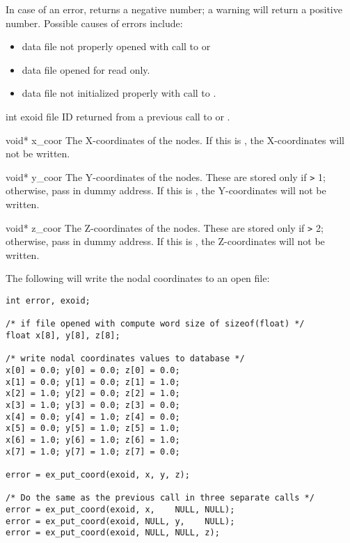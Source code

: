 In case of an error,  returns a negative 
number; a warning will return a positive number. 
Possible causes of errors include:

\begin{itemize}
 \item data file not properly opened with call to 
 or 

 \item data file opened for read only.

 \item data file not initialized properly with call to
 .
\end{itemize}




\begin{parameters}
\item[{int exoid \R{}}]
\exo{} file ID returned from a previous call to  
or .

\item[{void* x_coor \R{}}]
The X-coordinates of the nodes. If this is , the
X-coordinates will not be written.

\item[{void* y_coor \R{}}]
The Y-coordinates of the nodes. These are stored only if  
\texttt{>} 1; otherwise, pass in dummy address. If this is , the
Y-coordinates will not be written.

\item[{void* z_coor \R{}}]
The Z-coordinates of the nodes. These are stored only if  
\texttt{>} 2; otherwise, pass in dummy address. If this is , the
Z-coordinates will not be written.
\end{parameters}

The following will write the nodal coordinates to an open 
\exo{} file:

\begin{lstlisting}
int error, exoid;

/* if file opened with compute word size of sizeof(float) */
float x[8], y[8], z[8];

/* write nodal coordinates values to database */
x[0] = 0.0; y[0] = 0.0; z[0] = 0.0;
x[1] = 0.0; y[1] = 0.0; z[1] = 1.0;
x[2] = 1.0; y[2] = 0.0; z[2] = 1.0;
x[3] = 1.0; y[3] = 0.0; z[3] = 0.0;
x[4] = 0.0; y[4] = 1.0; z[4] = 0.0;
x[5] = 0.0; y[5] = 1.0; z[5] = 1.0;
x[6] = 1.0; y[6] = 1.0; z[6] = 1.0;
x[7] = 1.0; y[7] = 1.0; z[7] = 0.0;

error = ex_put_coord(exoid, x, y, z);

/* Do the same as the previous call in three separate calls */
error = ex_put_coord(exoid, x,    NULL, NULL);
error = ex_put_coord(exoid, NULL, y,    NULL);
error = ex_put_coord(exoid, NULL, NULL, z);
\end{lstlisting}


